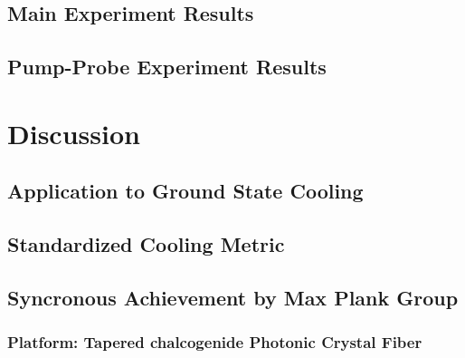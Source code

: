   \subsection{Main Experiment Results}

  \subsection{Pump-Probe Experiment Results}

\section{Discussion}

  \subsection{Application to Ground State Cooling}

  \subsection{Standardized Cooling Metric}

  \subsection{Syncronous Achievement by Max Plank Group}

    \subsubsection{Platform: Tapered chalcogenide Photonic Crystal Fiber}

  
